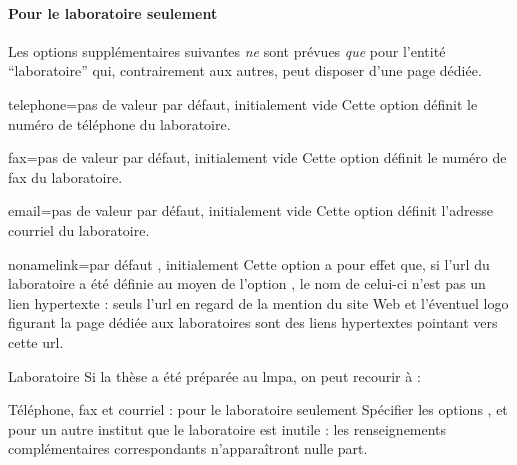 \paragraph{Pour le laboratoire seulement}

Les options supplémentaires suivantes \emph{ne} sont prévues
\emph{que} pour l'entité \enquote{laboratoire} qui, contrairement
aux autres, peut disposer d'une page dédiée\pagededieelabo.
%
\begin{docKey}{telephone}{=}{pas de valeur par défaut,
    initialement vide}
  Cette option définit le numéro de téléphone du laboratoire.
\end{docKey}
%
\begin{docKey}{fax}{=}{pas de valeur par défaut,
    initialement vide}
  Cette option définit le numéro de fax du laboratoire.
\end{docKey}
%
\begin{docKey}{email}{=}{pas de valeur par
    défaut, initialement vide}
  Cette option définit l'adresse courriel du laboratoire.
\end{docKey}
%
\begin{docKey}{nonamelink}{=\textbar{}}{par défaut
    , initialement }
  Cette option a pour effet que, si l'\acrshort{url} du laboratoire a été
  définie au moyen de l'option , le nom de celui-ci n'est pas un
  lien hypertexte : seuls l'\acrshort{url} en regard de la mention du site Web
  et l'éventuel logo figurant la page dédiée aux laboratoires\pagededieelabo{}
  sont des liens hypertextes pointant vers cette \acrshort{url}.
\end{docKey}
%
\begin{dbexample}{Laboratoire}{}
  Si la thèse a été préparée au \gls{lmpa}, on peut recourir à :
  \NoAutoSpacing%
\begin{bodycode}
\end{bodycode}
\end{dbexample}
%
\begin{dbremark}{Téléphone, fax et courriel : pour le
    laboratoire seulement}{}
  Spécifier les options ,  et  pour
  un autre institut que le laboratoire est inutile : les renseignements
  complémentaires correspondants n'apparaîtront nulle part.
\end{dbremark}
